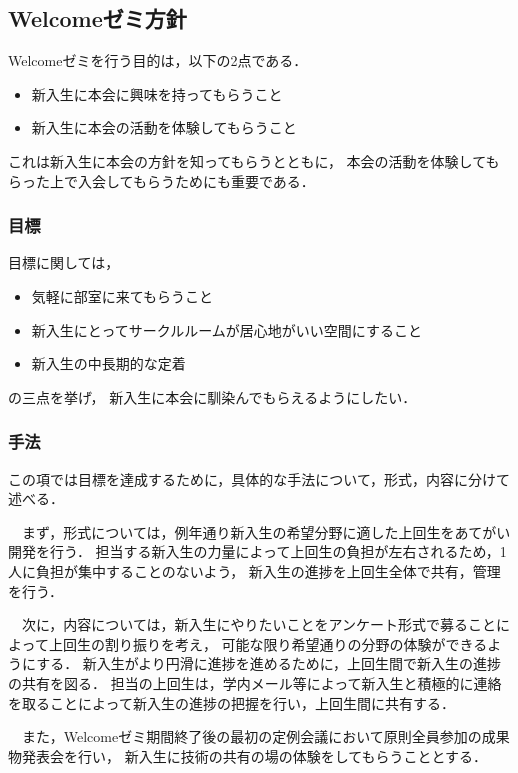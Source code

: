 \subsection*{Welcomeゼミ方針}


Welcomeゼミを行う目的は，以下の2点である．

\begin{itemize}
    \item 新入生に本会に興味を持ってもらうこと
    \item 新入生に本会の活動を体験してもらうこと
\end{itemize}
これは新入生に本会の方針を知ってもらうとともに，
本会の活動を体験してもらった上で入会してもらうためにも重要である．

\subsubsection*{目標}
目標に関しては，
\begin{itemize}
    \item 気軽に部室に来てもらうこと
    \item 新入生にとってサークルルームが居心地がいい空間にすること
    \item 新入生の中長期的な定着
\end{itemize}
の三点を挙げ，
新入生に本会に馴染んでもらえるようにしたい．

\subsubsection*{手法}
この項では目標を達成するために，具体的な手法について，形式，内容に分けて述べる．

　まず，形式については，例年通り新入生の希望分野に適した上回生をあてがい開発を行う．
担当する新入生の力量によって上回生の負担が左右されるため，1人に負担が集中することのないよう，
新入生の進捗を上回生全体で共有，管理を行う．

　次に，内容については，新入生にやりたいことをアンケート形式で募ることによって上回生の割り振りを考え，
可能な限り希望通りの分野の体験ができるようにする．
新入生がより円滑に進捗を進めるために，上回生間で新入生の進捗の共有を図る．
担当の上回生は，学内メール等によって新入生と積極的に連絡を取ることによって新入生の進捗の把握を行い，上回生間に共有する．

　また，Welcomeゼミ期間終了後の最初の定例会議において原則全員参加の成果物発表会を行い，
新入生に技術の共有の場の体験をしてもらうこととする．

